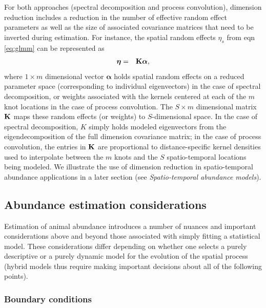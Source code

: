 \documentclass[times,mee,doublespace,]{besauth2}
\begin{document}
For both approaches (spectral decomposition and process convolution), dimension reduction includes a reduction in  the number of effective random effect parameters as well as the size of associated covariance matrices that need to be inverted during estimation.  For instance, the spatial random effects $\eta_s$ from eqn \ref{eq:glmm} can be represented as
\begin{eqnarray}
   \boldsymbol{\eta} & = & {\bf K} \boldsymbol{\alpha},
 \label{eq:reduced-spat}
\end{eqnarray}
where $1 \times m$ dimensional vector $\boldsymbol{\alpha}$ holds spatial random effects on a reduced parameter space (corresponding to individual eigenvectors) in the case of spectral decomposition, or weights associated with the kernels centered at each of the $m$ knot locations in the case of process convolution. The $S \times m$ dimensional matrix ${\bf K}$ maps these random effects (or weights) to $S$-dimensional space.  In the case of spectral decomposition, $K$ simply holds modeled eigenvectors from the eigendecomposition of the full dimension covariance matrix; in the case of process convolution, the entries in ${\bf K}$ are proportional to distance-specific kernel densities used to interpolate between the $m$ knots and the $S$ spatio-temporal locations being modeled.  We illustrate the use of dimension reduction in spatio-temporal abundance applications in a later section (see {\it Spatio-temporal abundance models}).

\subsection{Abundance estimation considerations}

Estimation of animal abundance introduces a number of nuances and important considerations above and beyond those associated with simply fitting a statistical model.  These considerations differ depending on whether one selects a purely descriptive or a purely dynamic model for the evolution of the spatial process (hybrid models thus require making important decisions about all of the following points).

\subsubsection{Boundary conditions}
\end{document}
